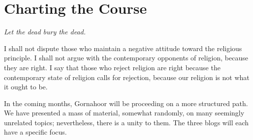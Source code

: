 \section{Charting the Course}

\emph{Let the dead bury the dead.}


\begin{quotex}
I shall not dispute those who maintain a negative attitude toward the religious principle. I shall not argue with the contemporary opponents of religion, because they are right. I say that those who reject religion are right because the contemporary state of religion calls for rejection, because our religion is not what it ought to be.
\end{quotex}


In the coming months, Gornahoor will be proceeding on a more structured path. We have presented a mass of material, somewhat randomly, on many seemingly unrelated topics; nevertheless, there is a unity to them. The three blogs will each have a specific focus.

